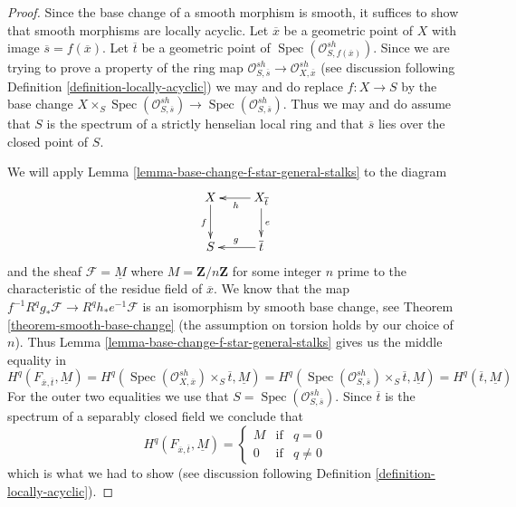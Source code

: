 \documentclass[10pt,a4paper]{amsart}
\theoremstyle{plain}
\theoremstyle{definition}
\theoremstyle{remark}
\numberwithin{equation}{subsection}
\def\Spec{\mathop{\mathrm{Spec}}}
\begin{document}
\begin{proof}
Since the base change of a smooth morphism is smooth, it suffices
to show that smooth morphisms are locally acyclic.
Let $\overline{x}$ be a geometric point of $X$ with image
$\overline{s} = f(\overline{x})$. Let
$\overline{t}$ be a geometric point of
$\Spec(\mathcal{O}^{sh}_{S, f(\overline{x})})$.
Since we are trying to prove a property of the ring map
$\mathcal{O}^{sh}_{S, \overline{s}} \to \mathcal{O}^{sh}_{X, \overline{x}}$
(see discussion following Definition \ref{definition-locally-acyclic})
we may and do replace $f : X \to S$ by the base change
$X \times_S \Spec(\mathcal{O}^{sh}_{S, \overline{s}}) \to
\Spec(\mathcal{O}^{sh}_{S, \overline{s}})$.
Thus we may and do assume that $S$ is the spectrum of a strictly
henselian local ring and that $\overline{s}$ lies over
the closed point of $S$.

\medskip\noindent
We will apply Lemma \ref{lemma-base-change-f-star-general-stalks}
to the diagram
$$
\xymatrix{
X \ar[d]_f & X_{\overline{t}} \ar[l]^h \ar[d]^e \\
S & \overline{t} \ar[l]_g
}
$$
and the sheaf $\mathcal{F} = \underline{M}$ where $M = \mathbf{Z}/n\mathbf{Z}$
for some integer $n$ prime to the characteristic of the residue field of
$\overline{x}$. We know that the map
$f^{-1}R^qg_*\mathcal{F} \to R^qh_*e^{-1}\mathcal{F}$
is an isomorphism by smooth base change, see
Theorem \ref{theorem-smooth-base-change} (the assumption
on torsion holds by our choice of $n$).
Thus Lemma \ref{lemma-base-change-f-star-general-stalks}
gives us the middle equality in
$$
H^q(F_{\overline{x}, \overline{t}}, \underline{M}) =
H^q(\Spec(\mathcal{O}^{sh}_{X, \overline{x}}) \times_S \overline{t},
\underline{M})
=
H^q(\Spec(\mathcal{O}^{sh}_{S, \overline{s}}) \times_S \overline{t},
\underline{M}) =
H^q(\overline{t}, \underline{M})
$$
For the outer two equalities we use that
$S = \Spec(\mathcal{O}^{sh}_{S, \overline{s}})$.
Since $\overline{t}$ is the spectrum of a separably
closed field we conclude that
$$
H^q(F_{\overline{x}, \overline{t}}, \underline{M}) =
\left\{
\begin{matrix}
M & \text{if} & q = 0 \\
0 & \text{if} & q \not = 0
\end{matrix}
\right.
$$
which is what we had to show (see discussion following
Definition \ref{definition-locally-acyclic}).
\end{proof}
\end{document}
